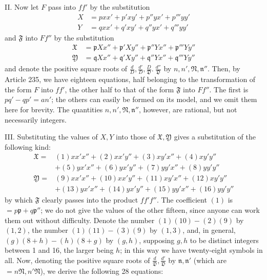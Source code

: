 II. Now let $F$ pass into $ff'$ by the substitution
\[
\begin{aligned}
X&=pxx'+p'xy'+p''yx'+p'''yy'\\
Y&=qxx'+q'xy'+q''yx'+q'''yy'
\end{aligned}
\]
and $\mathfrak{F}$ into $Ff''$ by the substitution
\[
\begin{aligned}
\mathfrak{X}&=\mathfrak{p}Xx''+\mathfrak{p}'Xy''+\mathfrak{p}''Yx''+\mathfrak{p}'''Yy''\\
\mathfrak{Y}&=\mathfrak{q}Xx''+\mathfrak{q}'Xy''+\mathfrak{q}''Yx''+\mathfrak{q}'''Yy''
\end{aligned}
\]
and denote the positive square roots of $\frac{d}{D},\frac{d'}{D},\frac{D}{\mathfrak{D}}.\ \frac{d''}{\mathfrak{D}}$ by $n,n',\mathfrak{N},\mathfrak{n}''$. Then, by Article 235, we have eighteen equations, half belonging to the transformation of the form $F$ into $ff'$, the other half to that of the form $\mathfrak{F}$ into $Ff''$. The first is $pq'-qp'=an'$; the others can easily be formed on its model, and we omit them here for brevity. The quantities $n,n',\mathfrak{N},\mathfrak{n}''$, however, are rational, but not necessarily integers.

III. Substituting the values of $X,Y$ into those of $\mathfrak{X},\mathfrak{Y}$ gives a substitution of the following kind:
\[
\begin{aligned}
\mathfrak{X}={}&(1)xx'x''+(2)xx'y''+(3)xy'x''+(4)xy'y''\\
&+(5)yx'x''+(6)yx'y''+(7)yy'x''+(8)yy'y''\\
\mathfrak{Y}={}&(9)xx'x''+(10)xx'y''+(11)xy'x''+(12)xy'y''\\
&+(13)yx'x''+(14)yx'y''+(15)yy'x''+(16)yy'y''
\end{aligned}
\]
by which $\mathfrak{F}$ clearly passes into the product $ff'f''$. The coefficient $(1)$ is $=p\mathfrak{p}+q\mathfrak{p}''$; we do not give the values of the other fifteen, since anyone can work them out without difficulty. Denote the number $(1)(10)-(2)(9)$ by $(1,2)$, the number $(1)(11)-(3)(9)$ by $(1,3)$, and, in general, $(g)(8+h)-(h)(8+g)$ by $(g,h)$, supposing $g,h$ to be distinct integers between 1 and 16, the larger being $h$; in this way we have twenty-eight symbols in all. Now, denoting the positive square roots of $\frac{d}{\mathfrak{D}},\frac{d'}{\mathfrak{D}}$ by $\mathfrak{n},\mathfrak{n}'$ (which are $=n\mathfrak{N},n'\mathfrak{N}$), we derive the following 28 equations:

